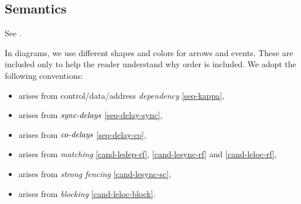 \subsection{Semantics}



See .

In diagrams, we use different shapes and colors for arrows and events.  These
are included only to help the reader understand why order is included.  We
adopt the following conventions:
\begin{itemize}  
\item \makebox{$\aEv\xpo\bEv$} arises from control/data/address \emph{dependency} \eqref{seq-kappa},
\item \makebox{$\aEv\xsync\bEv$} arises from $\mathrel{\textnormal{\emph{sync-delays}}}$ \eqref{seq-delay-sync},
\item \makebox{$\aEv\xwki\bEv$} arises from $\mathrel{\textnormal{\emph{co-delays}}}$ \eqref{seq-delay-co},
\item \makebox{$\aEv\xrf\bEv$} arises from \emph{matching}
  \eqref{cand-ledep-rf}, \eqref{cand-lesync-rf} and \eqref{cand-leloc-rf},
\item \makebox{$\aEv\xsyncsc\bEv$} arises from \emph{strong fencing} \eqref{cand-lesync-sc},
\item \makebox{$\aEv\xwk\bEv$} arises from \emph{blocking} \eqref{cand-leloc-block}.
\end{itemize}

